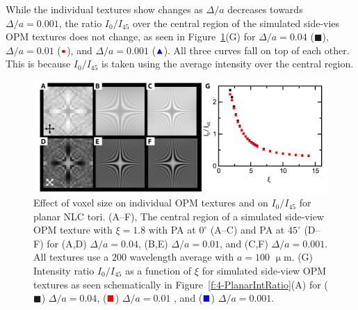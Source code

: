 While the individual textures show changes as $\Delta /a$ decreases towards $\Delta /a = 0.001$, the ratio $I_0/I_{45}$ over the central region of the simulated side-vies OPM textures does not change, as seen in Figure~\ref{f:4-PlanarVoxel}(G) for $\Delta /a = 0.04$ ($\blacksquare$), $\Delta /a = 0.01$ (${\color{red}\bullet}$), and $\Delta /a = 0.001$ (${\color{blue}\blacktriangle}$).
All three curves fall on top of each other.
This is because $I_0/I_{45}$ is taken using the average intensity over the central region.
\begin{figure}
\centering
\includegraphics{figures/C4/Ch4-Figs_SimDeltaTest.png}
\caption{Effect of voxel size on individual OPM textures and on $I_0/I_{45}$ for planar NLC tori.
(A--F), The central region of a simulated side-view OPM texture with $\xi = 1.8$ with PA at $0^{\circ}$ (A--C) and PA at $45^{\circ}$ (D--F) for (A,D) $\Delta /a = 0.04$, (B,E) $\Delta /a = 0.01$, and (C,F) $\Delta /a = 0.001$.
All textures use a $200$ wavelength average with $a = 100$ $\upmu$m.
(G) Intensity ratio $I_0/I_{45}$ as a function of $\xi$ for simulated side-view OPM textures as seen schematically in Figure~\ref{f:4-PlanarIntRatio}(A) for ($\blacksquare$) $\Delta /a = 0.04$, (${\color{red}\blacksquare}$) $\Delta /a = 0.01$ , and (${\color{blue}\blacksquare}$) $\Delta /a = 0.001$.
}\label{f:4-PlanarVoxel}
\end{figure}

